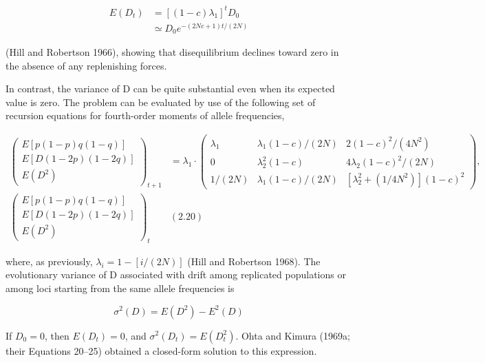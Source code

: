 \documentclass{article}
\begin{document}
\begin{equation}
\begin{aligned}E(D_{t})&=[(1-c)\lambda_{1}]^{t}D_{0}\\&\simeq D_{0}e^{-(2Nc+1)t/(2N)}\end{aligned}
\tag{2.19}
\label{eq:2_19}
\end{equation}

(Hill and Robertson 1966), showing that disequilibrium declines toward zero in the absence of any replenishing forces.

In contrast, the variance of D can be quite substantial even when its expected value is zero. The problem can be evaluated by use of the following set of recursion equations for fourth-order moments of allele frequencies,

\begin{equation}
\begin{align*}\left(\begin{array}{c}E[p(1-p)q(1-q)]\\E[D(1-2p)(1-2q)]\\E(D^{2})\end{array}\right)_{t+1}&=\lambda_{1}\cdot\left(\begin{array}{ccc}\lambda_{1}&\lambda_{1}(1-c)/(2N)&2(1-c)^{2}/(4N^{2})\\0&\lambda_{2}^{2}(1-c)&4\lambda_{2}(1-c)^{2}/(2N)\\1/(2N)&\lambda_{1}(1-c)/(2N)&[\lambda_{2}^{2}+(1/4N^{2})](1-c)^{2}\end{array}\right),\\\left(\begin{array}{c}E[p(1-p)q(1-q)]\\E[D(1-2p)(1-2q)]\\E(D^{2})\end{array}\right)_{t}&(2.20)\end{align*}
\end{equation}

where, as previously,  $ \lambda_{i}=1-[i/(2N)] $ (Hill and Robertson 1968). The evolutionary variance of D associated with drift among replicated populations or among loci starting from the same allele frequencies is

\begin{equation}
\sigma^{2}(D)=E(D^{2})-E^{2}(D)
\tag{2.21}
\label{eq:2_21}
\end{equation}

If $D_0 = 0$, then $E(D_t) = 0$, and $\sigma^2(D_t) = E(D_t^2)$. Ohta and Kimura (1969a; their Equations 20–25) obtained a closed-form solution to this expression.
\end{document}

